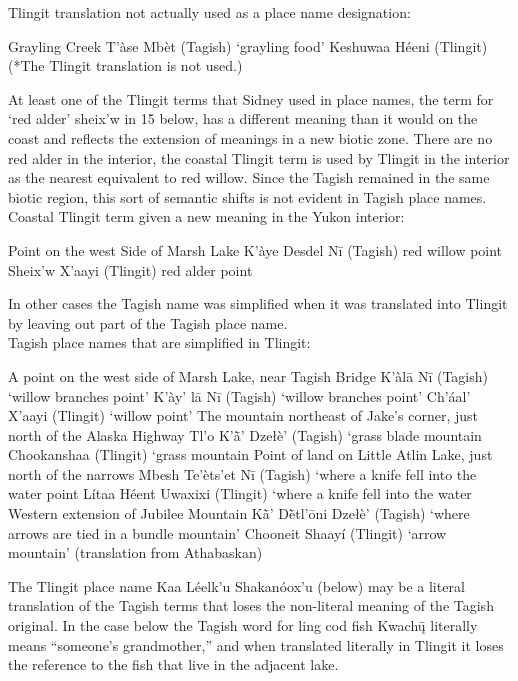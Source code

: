 Tlingit translation not actually used as a place name designation:
\begin{exe}
	 	Grayling Creek
	\sn T’àse Mbèt (Tagish)		`grayling food'
	\sn *Keshuwaa Héeni (Tlingit)	(*The Tlingit translation is not used.)
\end{exe}

At least one of the Tlingit terms that Sidney used in place names, the term for ‘red alder’ sheix’w in 15 below, has a different meaning than it would on the coast and reflects the extension of meanings in a new biotic zone. There are no red alder in the interior, the coastal Tlingit term is used by Tlingit in the interior as the nearest equivalent to red willow. Since the Tagish remained in the same biotic region, this sort of semantic shifts is not evident in Tagish place names.\\

Coastal Tlingit term given a new meaning in the Yukon interior:
\begin{exe}
 Point on the west Side of Marsh Lake
	\sn K’àye Desdel Nī (Tagish)	red willow point
\sn Sheix’w X’aayi (Tlingit)	red alder point
\end{exe}
\noindent
In other cases the Tagish name was simplified when it was translated into Tlingit by leaving out part of the Tagish place name.\\

Tagish place names that are simplified in Tlingit:
\begin{exe}
 A point on the west side of Marsh Lake, near Tagish Bridge
	\sn K’àlā Nī (Tagish)		`willow branches point'
	\sn K’ày’ lā Nī (Tagish)		`willow branches point'
	\sn Ch’áal’ X’aayi (Tlingit)		`willow point'
  The mountain northeast of Jake’s corner, just north of the Alaska Highway
	\sn Tl’o K’ā̀’ Dzełè’	(Tagish)	`grass blade mountain
	\sn Chookanshaa (Tlingit)		`grass mountain
 Point of land on Little Atlin Lake, just north of the narrows
	\sn Mbesh Te’èts’et Nī (Tagish)	`where a knife fell into the water point
	\sn Lítaa Héent Uwaxixi (Tlingit)	`where a knife fell into the water
 Western extension of Jubilee Mountain
	\sn Kā̀’ Dḕtl’ōni Dzełè’ (Tagish)	`where arrows are tied in a bundle mountain'
	\sn Chooneit Shaayí  (Tlingit)	`arrow mountain' (translation from Athabaskan)
\end{exe}

The Tlingit place name Kaa  Léelk’u Shakanóox’u (below) may be a literal translation of the Tagish terms that loses the non-literal meaning of the Tagish original. In the case below the Tagish word for ling cod fish Kwachų̄ literally means “someone’s grandmother,” and when translated literally in Tlingit it loses the reference to the fish that live in the adjacent lake.\\

